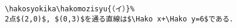 \begin{verbatim}
\hakosyokika\hakomozisyu{（イ）}%
2点$(2,0)$, $(0,3)$を通る直線は$\Hako x+\Hako y=6$である．
\end{verbatim}
